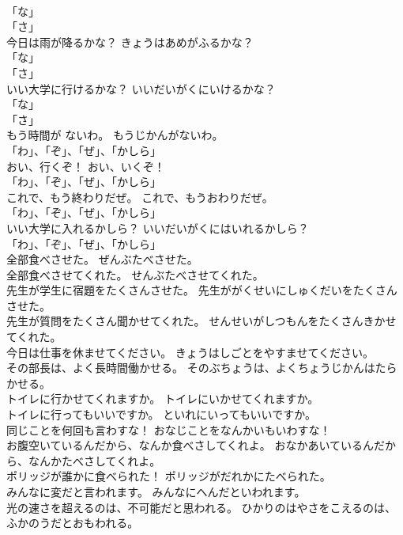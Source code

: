 \documentclass[8pt]{extreport}
\begin{document}
\begin{CJK}{UTF8}{min}
\\	「な」 
\\	「さ」	
\\	今日は雨が降るかな？	きょうはあめがふるかな？	
\\	「な」 
\\	「さ」	
\\	いい大学に行けるかな？	いいだいがくにいけるかな？	
\\	「な」 
\\	「さ」	
\\	もう時間が ないわ。	もうじかんがないわ。	
\\	「わ」、「ぞ」、「ぜ」、「かしら」	
\\	おい、行くぞ！	おい、いくぞ！	
\\	「わ」、「ぞ」、「ぜ」、「かしら」	
\\	これで、もう終わりだぜ。	これで、もうおわりだぜ。	
\\	「わ」、「ぞ」、「ぜ」、「かしら」	
\\	いい大学に入れるかしら？	いいだいがくにはいれるかしら？	
\\	「わ」、「ぞ」、「ぜ」、「かしら」	
\\	全部食べさせた。	ぜんぶたべさせた。	
\\	全部食べさせてくれた。	せんぶたべさせてくれた。	
\\	先生が学生に宿題をたくさんさせた。	先生ががくせいにしゅくだいをたくさんさせた。	
\\	先生が質問をたくさん聞かせてくれた。	せんせいがしつもんをたくさんきかせてくれた。	
\\	今日は仕事を休ませてください。	きょうはしごとをやすませてください。	
\\	その部長は、よく長時間働かせる。	そのぶちょうは、よくちょうじかんはたらかせる。	
\\	トイレに行かせてくれますか。	トイレにいかせてくれますか。	
\\	トイレに行ってもいいですか。	といれにいってもいいですか。	
\\	同じことを何回も言わすな！	おなじことをなんかいもいわすな！	
\\	お腹空いているんだから、なんか食べさしてくれよ。	おなかあいているんだから、なんかたべさしてくれよ。	
\\	ポリッジが誰かに食べられた！	ポリッジがだれかにたべられた。	
\\	みんなに変だと言われます。	みんなにへんだといわれます。	
\\	光の速さを超えるのは、不可能だと思われる。	ひかりのはやさをこえるのは、ふかのうだとおもわれる。	

\end{CJK}
\end{document}
